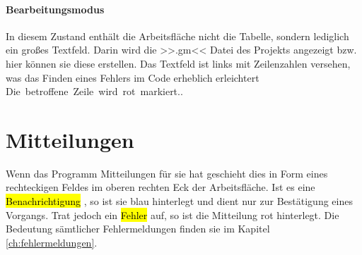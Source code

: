 \paragraph{Bearbeitungsmodus} In diesem Zustand enthält die Arbeitsfläche nicht die Tabelle, sondern lediglich ein großes Textfeld. Darin wird die >>.gm<< Datei des Projekts angezeigt bzw. hier können sie diese erstellen. Das Textfeld ist links mit Zeilenzahlen versehen, was das Finden eines Fehlers im Code erheblich erleichtert \mbox{Die betroffene Zeile wird rot markiert.}.

\section{Mitteilungen}
\label{sec:mitteilungen}

Wenn das Programm Mitteilungen für sie hat geschieht dies in Form eines rechteckigen Feldes im oberen rechten Eck der Arbeitsfläche. Ist es eine \hl{Benachrichtigung} , so ist sie blau hinterlegt und dient nur zur Bestätigung eines Vorgangs. Trat jedoch ein \hl{Fehler} auf, so ist die Mitteilung  rot hinterlegt. Die Bedeutung sämtlicher Fehlermeldungen finden sie im Kapitel \ref{ch:fehlermeldungen}.
